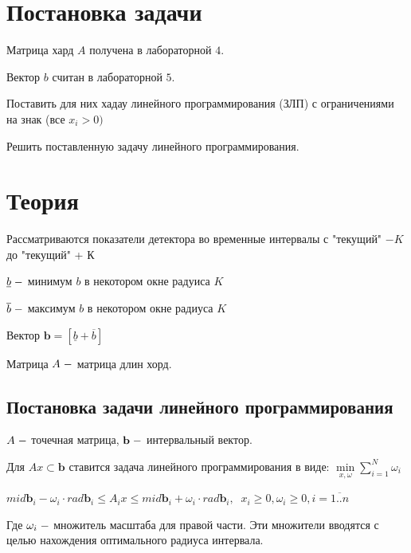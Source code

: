\documentclass[a4]{article}
\renewcommand{\listoffigures}{\begingroup %
\tocsection
\tocfile{\listfigurename}{lof}
\endgroup}
\begin{document}
\newpage
\pagestyle{plain}



\newpage
\tableofcontents{}
\newpage
\listoffigures{}
\newpage

\section{Постановка задачи}
Матрица хард $A$ получена в лабораторной $4.$

Вектор $b$ считан в лабораторной $5.$

Поставить для них хадау линейного программирования (ЗЛП) с ограничениями на знак (все $x_i > 0)$

Решить поставленную задачу линейного программирования.


\section{Теория}

Рассматриваются показатели детектора во временные интервалы с "текущий" $ \minus K$ до "текущий" + К

$\underline b\;\--$ минимум $b$ в некотором окне радуиса $K$

$\overline b\;\--$ максимум $b$ в некотором окне радиуса $K$

Вектор $\mathbf{b}=[\underline b+\overline b]$

Матрица $A\;\--$ матрица длин хорд.

\subsection{Постановка задачи линейного программирования}
$A\;\--$ точечная матрица, $\mathbf{b}\;\--$ интервальный вектор.

Для $Ax\subset\mathbf{b}$ ставится задача линейного программирования в виде: $\min\limits_{x,\omega}\sum\limits_{i=1}^N\omega_i$

$mid \mathbf{b}_i-\omega_i\cdot rad \mathbf{b}_i\leq A_ix\leq mid \mathbf{b}_i+\omega_i\cdot rad \mathbf{b}_i,\;\;x_i\geq 0, \omega_i\geq 0, i=\overline{1..n}$

Где $\omega_i\;\--$ множитель масштаба для правой части. Эти множители вводятся с целью нахождения оптимального радиуса интервала.
\end{document}
